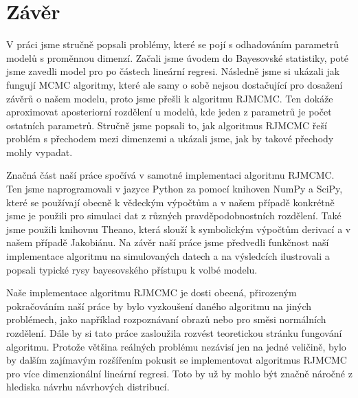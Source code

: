 \documentclass[czech,master,public,dept470,male,cpdeclaration,oneside, python]{diploma}
\begin{document}
\section{Závěr}
V práci jsme stručně popsali problémy, které se pojí s odhadováním parametrů modelů s proměnnou dimenzí. Začali jsme úvodem do Bayesovské statistiky, poté jsme zavedli model pro po částech lineární regresi. Následně jsme si ukázali jak fungují MCMC algoritmy, které ale samy o sobě nejsou dostačující pro dosažení závěrů o našem modelu, proto jsme přešli k algoritmu RJMCMC. Ten dokáže aproximovat aposteriorní rozdělení u modelů, kde jeden z parametrů je počet ostatních parametrů. Stručně jsme popsali to, jak algoritmus RJMCMC řeší problém s přechodem mezi dimenzemi a ukázali jsme, jak by takové přechody mohly vypadat. \par
Značná část naší práce spočívá v samotné implementaci algoritmu RJMCMC. Ten jsme naprogramovali v jazyce Python za pomocí knihoven NumPy a SciPy, které se používají obecně k vědeckým výpočtům a v našem případě konkrétně jsme je použili pro simulaci dat z různých pravděpodobnostních rozdělení. Také jsme použili knihovnu Theano, která slouží k symbolickým výpočtům derivací a v našem případě Jakobiánu. Na závěr naší práce jsme předvedli funkčnost naší implementace algoritmu na simulovaných datech a na výsledcích ilustrovali a popsali typické rysy bayesovského přístupu k volbé modelu. \par
Naše implementace algoritmu RJMCMC je dosti obecná, přirozeným pokračováním naší práce by bylo vyzkoušení daného algoritmu na jiných problémech, jako například rozpoznávaní obrazů nebo pro směsi normálních rozdělení. Dále by si tato práce zasloužila rozvést teoretickou stránku fungování algoritmu. Protože většina reálných problému nezávisí jen na jedné veličině, bylo by dalším zajímavým rozšířením pokusit se implementovat algoritmus RJMCMC pro více dimenzionální lineární regresi. Toto by už by mohlo být značně náročné z hlediska návrhu návrhových distribucí. 



\end{document}
